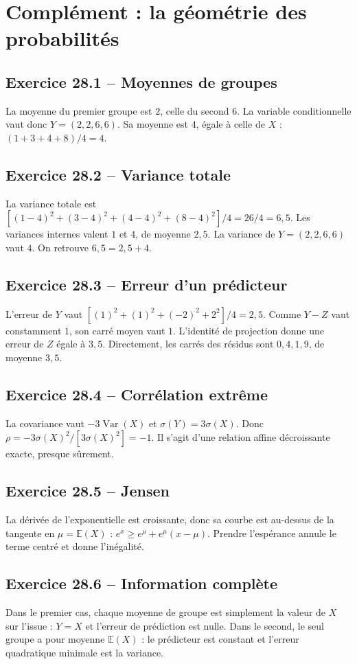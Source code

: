 \chapter{Complément : la géométrie des probabilités}
\section*{Exercice 28.1 -- Moyennes de groupes}
La moyenne du premier groupe est $2$, celle du second $6$. La variable conditionnelle vaut donc $Y=(2,2,6,6)$. Sa moyenne est $4$, égale à celle de $X$ : $(1+3+4+8)/4=4$.

\section*{Exercice 28.2 -- Variance totale}
La variance totale est $[(1-4)^2+(3-4)^2+(4-4)^2+(8-4)^2]/4=26/4=6{,}5$. Les variances internes valent $1$ et $4$, de moyenne $2{,}5$. La variance de $Y=(2,2,6,6)$ vaut $4$. On retrouve $6{,}5=2{,}5+4$.

\section*{Exercice 28.3 -- Erreur d'un prédicteur}
L'erreur de $Y$ vaut $[(1)^2+(1)^2+(-2)^2+2^2]/4=2{,}5$. Comme $Y-Z$ vaut constamment $1$, son carré moyen vaut $1$. L'identité de projection donne une erreur de $Z$ égale à $3{,}5$. Directement, les carrés des résidus sont $0,4,1,9$, de moyenne $3{,}5$.

\section*{Exercice 28.4 -- Corrélation extrême}
La covariance vaut $-3\operatorname{Var}(X)$ et $\sigma(Y)=3\sigma(X)$. Donc $\rho=-3\sigma(X)^2/[3\sigma(X)^2]=-1$. Il s'agit d'une relation affine décroissante exacte, presque sûrement.

\section*{Exercice 28.5 -- Jensen}
La dérivée de l'exponentielle est croissante, donc sa courbe est au-dessus de la tangente en $\mu=\mathbb E(X)$ : $e^x\ge e^\mu+e^\mu(x-\mu)$. Prendre l'espérance annule le terme centré et donne l'inégalité.

\section*{Exercice 28.6 -- Information complète}
Dans le premier cas, chaque moyenne de groupe est simplement la valeur de $X$ sur l'issue : $Y=X$ et l'erreur de prédiction est nulle. Dans le second, le seul groupe a pour moyenne $\mathbb E(X)$ : le prédicteur est constant et l'erreur quadratique minimale est la variance.
